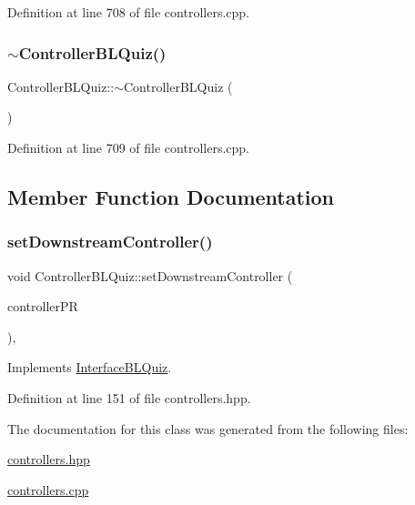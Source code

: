 Definition at line 708 of file controllers.\+cpp.

\mbox{\label{class_controller_b_l_quiz_adaa97972e920e1640424530335f07703}} 
\subsubsection{\texorpdfstring{$\sim$\+Controller\+B\+L\+Quiz()}{~ControllerBLQuiz()}}
{\footnotesize\ttfamily Controller\+B\+L\+Quiz\+::$\sim$\+Controller\+B\+L\+Quiz (\begin{DoxyParamCaption}{ }\end{DoxyParamCaption})}



Definition at line 709 of file controllers.\+cpp.



\subsection{Member Function Documentation}
\mbox{\label{class_controller_b_l_quiz_a77ada4c0f633482129e9179e24f6f2a8}} 
\subsubsection{\texorpdfstring{set\+Downstream\+Controller()}{setDownstreamController()}}
{\footnotesize\ttfamily void Controller\+B\+L\+Quiz\+::set\+Downstream\+Controller (\begin{DoxyParamCaption}\item[{\hyperlink{class_stub_p_r}{Stub\+PR} $\ast$}]{controller\+PR }\end{DoxyParamCaption})\hspace{0.3cm}{\ttfamily [inline]}, {\ttfamily [virtual]}}



Implements \hyperlink{class_interface_b_l_quiz_aa2af7b48e4caf5ecdf446f64a351c86f}{Interface\+B\+L\+Quiz}.



Definition at line 151 of file controllers.\+hpp.



The documentation for this class was generated from the following files\+:\begin{DoxyCompactItemize}
\item 
\hyperlink{controllers_8hpp}{controllers.\+hpp}\item 
\hyperlink{controllers_8cpp}{controllers.\+cpp}\end{DoxyCompactItemize}
